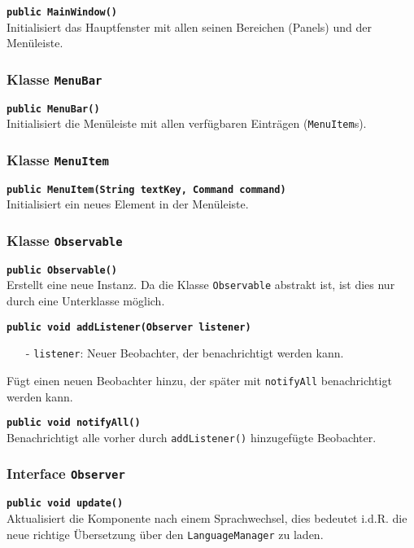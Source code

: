 \documentclass[parskip=full,11pt,twoside]{scrartcl}
\begin{document}
\textbf{\texttt{public MainWindow()}}\\
Initialisiert das Hauptfenster mit allen seinen Bereichen (Panels) und der Menüleiste.

\subsubsection{Klasse \texttt{MenuBar}}

\textbf{\texttt{public MenuBar()}}\\
Initialisiert die Menüleiste mit allen verfügbaren Einträgen (\texttt{MenuItem}s).

\subsubsection{Klasse \texttt{MenuItem}}

\textbf{\texttt{public MenuItem(String textKey, Command command)}}\\
Initialisiert ein neues Element in der Menüleiste.

\subsubsection{Klasse \texttt{Observable}}

\textbf{\texttt{public Observable()}}\\
Erstellt eine neue Instanz. Da die Klasse \texttt{Observable} abstrakt ist, ist dies nur durch eine Unterklasse möglich.

\textbf{\texttt{public void addListener(Observer listener)}}
\begin{itemize}[noitemsep]
	\item[-] \texttt{listener}: Neuer Beobachter, der benachrichtigt werden kann.
\end{itemize}
Fügt einen neuen Beobachter hinzu, der später mit \texttt{notifyAll} benachrichtigt werden kann.

\textbf{\texttt{public void notifyAll()}}\\
Benachrichtigt alle vorher durch \texttt{addListener()} hinzugefügte Beobachter.

\subsubsection{Interface \texttt{Observer}}

\textbf{\texttt{public void update()}}\\
Aktualisiert die Komponente nach einem Sprachwechsel, dies bedeutet i.d.R. die neue richtige Übersetzung über den \texttt{LanguageManager} zu laden.
\end{document}

